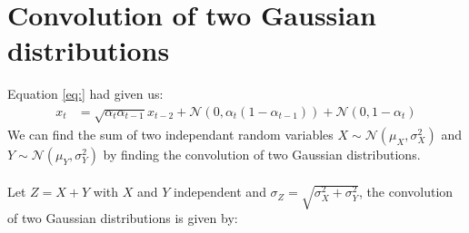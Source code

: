\documentclass{article}
\begin{document}
\section{Convolution of two Gaussian distributions}
Equation \ref{eq:} had given us:
\begin{align*}
  x_t &= \sqrt{\alpha_t \alpha_{t-1}} x_{t-2} + \mathcal{N}\left(0, \alpha_t\left(1 - \alpha_{t-1}\right)\right) + \mathcal{N}\left(0, 1 - \alpha_t\right)
\end{align*}
We can find the sum of two independant random variables $X \sim \mathcal{N}\left(\mu_X, \sigma_X^2\right)$ and $Y \sim \mathcal{N}\left(\mu_Y, \sigma_Y^2\right)$ by finding the convolution of two Gaussian distributions.
\\\\
Let $Z = X + Y$ with $X$ and $Y$ independent and $\sigma_Z = \sqrt{\sigma_X^2 + \sigma_Y^2}$, the convolution of two Gaussian distributions is given by:
\end{document}
